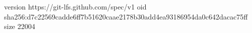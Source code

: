 version https://git-lfs.github.com/spec/v1
oid sha256:d7c22569cadde6ff7b51620caae2178b30add4ea93186954da0c642dacac75ff
size 22004
